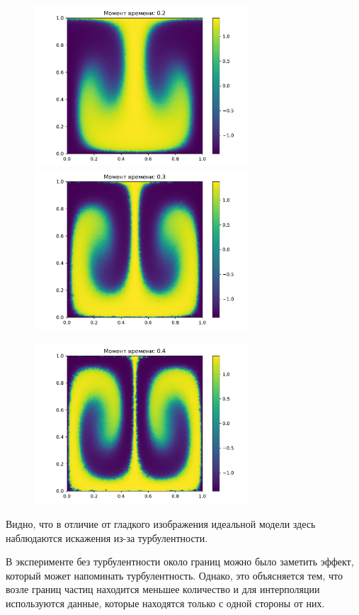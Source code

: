        \begin{figure}[H]
            \centering
            \includegraphics[width=8cm]{pictures/pr10.pdf}
            \includegraphics[width=8cm]{pictures/pr15.pdf}
        \end{figure}
        \begin{figure}[H]
            \centering
            \includegraphics[width=8cm]{pictures/pr20.pdf}
        \end{figure}

        Видно, что в отличие от гладкого изображения идеальной модели здесь наблюдаются искажения из-за турбулентности.

        В эксперименте без турбулентности около границ можно было заметить эффект, который может напоминать турбулентность. Однако, это объясняется тем, что возле границ частиц находится меньшее количество и для интерполяции используются данные, которые находятся только с одной стороны от них.